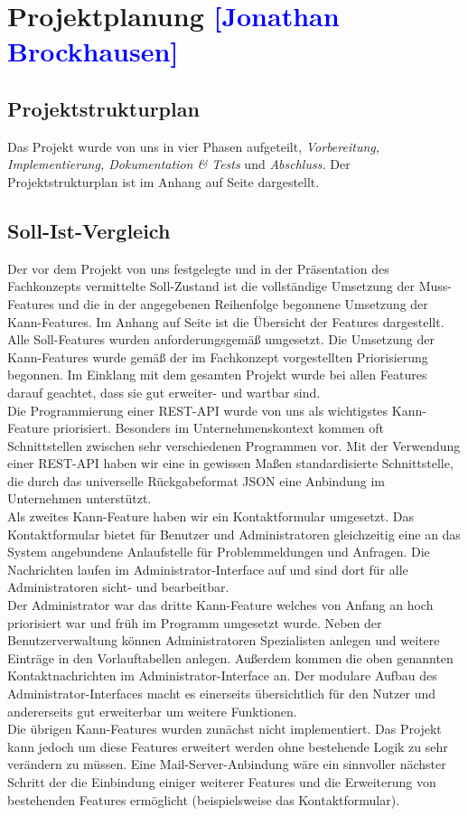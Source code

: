 

\section{Projektplanung \textcolor{blue}{[Jonathan Brockhausen]}}

\subsection{Projektstrukturplan}
Das Projekt wurde von uns in vier Phasen aufgeteilt, \textit{Vorbereitung, Implementierung, Dokumentation \& Tests} und \textit{Abschluss.}
Der Projektstrukturplan ist im Anhang auf Seite \pageref{PSP} dargestellt.

\subsection{Soll-Ist-Vergleich}
Der vor dem Projekt von uns festgelegte und in der Präsentation des Fachkonzepts vermittelte Soll-Zustand ist die vollständige Umsetzung der Muss-Features und die in der angegebenen Reihenfolge begonnene Umsetzung der Kann-Features.
Im Anhang auf Seite \pageref{PM_SOLLIST} ist die Übersicht der Features dargestellt. Alle Soll-Features wurden anforderungsgemäß umgesetzt. Die Umsetzung der Kann-Features wurde gemäß der im Fachkonzept vorgestellten Priorisierung begonnen. Im Einklang mit dem gesamten Projekt wurde bei allen Features darauf geachtet, dass sie gut erweiter- und wartbar sind.\\
Die Programmierung einer REST-API wurde von uns als wichtigstes Kann-Feature priorisiert. Besonders im Unternehmenskontext kommen oft Schnittstellen zwischen sehr verschiedenen Programmen vor. Mit der Verwendung einer REST-API haben wir eine in gewissen Maßen standardisierte Schnittstelle, die durch das universelle Rückgabeformat JSON eine Anbindung im Unternehmen unterstützt. \\
Als zweites Kann-Feature haben wir ein Kontaktformular umgesetzt. Das Kontaktformular bietet für Benutzer und Administratoren gleichzeitig eine an das System angebundene Anlaufstelle für Problemmeldungen und Anfragen. Die Nachrichten laufen im Administrator-Interface auf und sind dort für alle Administratoren sicht- und bearbeitbar.\\
Der Administrator war das dritte Kann-Feature welches von Anfang an hoch priorisiert war und früh im Programm umgesetzt wurde. Neben der Benutzerverwaltung können Administratoren Spezialisten anlegen und weitere Einträge in den Vorlauftabellen anlegen. Außerdem kommen die oben genannten Kontaktnachrichten im Administrator-Interface an. Der modulare Aufbau des Administrator-Interfaces macht es einerseits übersichtlich für den Nutzer und andererseits gut erweiterbar um weitere Funktionen.\\
Die übrigen Kann-Features wurden zunächst nicht implementiert. Das Projekt kann jedoch um diese Features erweitert werden ohne bestehende Logik zu sehr verändern zu müssen. Eine Mail-Server-Anbindung wäre ein sinnvoller nächster Schritt der die Einbindung einiger weiterer Features und die Erweiterung von bestehenden Features ermöglicht (beispielsweise das Kontaktformular).

